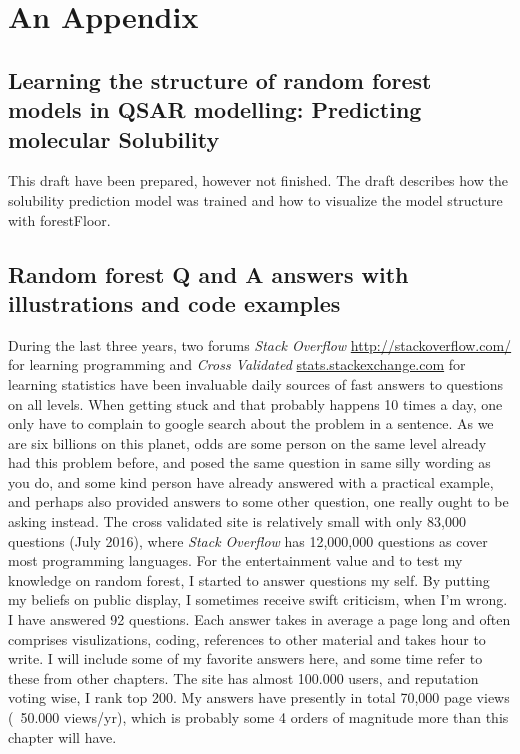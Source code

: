 \chapter{An Appendix}

\section{Learning the structure of random forest models in QSAR
modelling: Predicting molecular Solubility}
\label{article:solubility}

This draft have been prepared, however not finished. The draft describes how the solubility prediction model was trained and how to visualize the model structure with forestFloor.



\section{Random forest Q and A answers with illustrations and code examples}

During the last three years, two forums \textit{Stack Overflow} \url{http://stackoverflow.com/} for learning programming and \textit{Cross Validated} \url{stats.stackexchange.com} for learning statistics have been invaluable daily sources of fast answers to questions on all levels. When getting stuck and that probably happens 10 times a day, one only have to complain to google search about the problem in a sentence. As we are six billions on this planet, odds are some person on the same level already had this problem before, and posed the same question in same silly wording as you do, and some kind person have already answered with a practical example, and perhaps also provided answers to some other question, one really ought to be asking instead. The cross validated site is relatively small with only 83,000 questions (July 2016), where \textit{Stack Overflow} has 12,000,000 questions as cover most programming languages. For the entertainment value and to test my knowledge on random forest, I started to answer questions my self. By putting my beliefs on public display, I sometimes receive swift criticism, when I'm wrong. I have answered 92 questions. Each answer takes in average  a page long and often comprises visulizations, coding, references to other material and takes hour to write. I will include some of my favorite answers here, and some time refer to these from other chapters. The site has almost 100.000 users, and reputation voting wise, I rank top 200. My answers have presently in total 70,000 page views (~50.000 views/yr), which is probably some 4 orders of magnitude more than this chapter will have.


